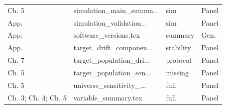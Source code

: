 \begin{longtable}{@{}p{}p{}p{}p{}@{}}
Ch. 5 & simulation\_main\_summa... & sim & Panel \\
App. & simulation\_validation... & sim & Panel \\
App. & software\_versions.tex & summary & Gen. \\
App. & target\_drift\_componen... & stability & Panel \\
Ch. 7 & target\_population\_dri... & protocol & Panel \\
Ch. 5 & target\_population\_sen... & missing & Panel \\
Ch. 5 & universe\_sensitivity\_... & full & Panel \\
Ch. 3; Ch. 4; Ch. 5 & variable\_summary.tex & full & Panel \\
\bottomrule
\end{longtable}
\endgroup
